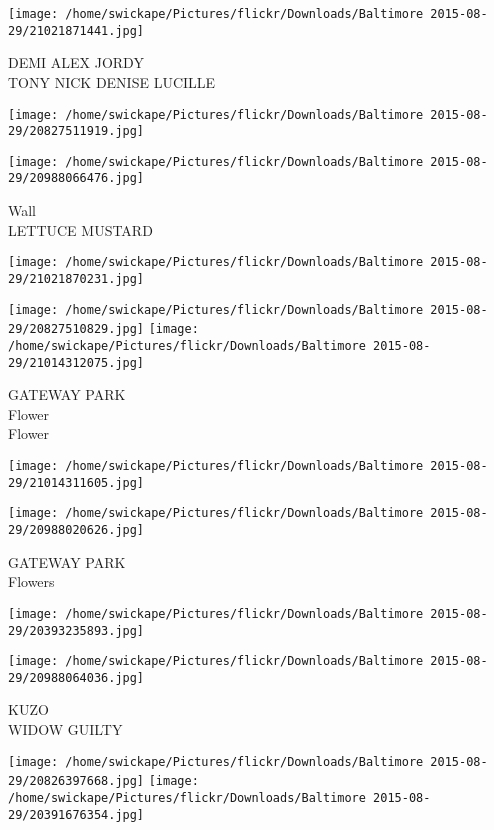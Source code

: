 \documentclass[10pt,letterpaper]{article}
\begin{document}
\vspace{0.25in}
\texttt{[image: /home/swickape/Pictures/flickr/Downloads/Baltimore 2015-08-29/21021871441.jpg]}

DEMI ALEX JORDY\\
TONY NICK DENISE LUCILLE
\pagebreak

\texttt{[image: /home/swickape/Pictures/flickr/Downloads/Baltimore 2015-08-29/20827511919.jpg]}

\vspace{0.25in}
\texttt{[image: /home/swickape/Pictures/flickr/Downloads/Baltimore 2015-08-29/20988066476.jpg]}

Wall\\
LETTUCE MUSTARD
\pagebreak

\texttt{[image: /home/swickape/Pictures/flickr/Downloads/Baltimore 2015-08-29/21021870231.jpg]}

\vspace{0.25in}
\texttt{[image: /home/swickape/Pictures/flickr/Downloads/Baltimore 2015-08-29/20827510829.jpg]}
\texttt{[image: /home/swickape/Pictures/flickr/Downloads/Baltimore 2015-08-29/21014312075.jpg]}

GATEWAY PARK\\
Flower\\
Flower
\pagebreak

\texttt{[image: /home/swickape/Pictures/flickr/Downloads/Baltimore 2015-08-29/21014311605.jpg]}

\vspace{0.25in}
\texttt{[image: /home/swickape/Pictures/flickr/Downloads/Baltimore 2015-08-29/20988020626.jpg]}

GATEWAY PARK\\
Flowers
\pagebreak

\texttt{[image: /home/swickape/Pictures/flickr/Downloads/Baltimore 2015-08-29/20393235893.jpg]}

\vspace{0.25in}
\texttt{[image: /home/swickape/Pictures/flickr/Downloads/Baltimore 2015-08-29/20988064036.jpg]}

KUZO\\
WIDOW GUILTY
\pagebreak

\texttt{[image: /home/swickape/Pictures/flickr/Downloads/Baltimore 2015-08-29/20826397668.jpg]}
\texttt{[image: /home/swickape/Pictures/flickr/Downloads/Baltimore 2015-08-29/20391676354.jpg]}
\end{document}
